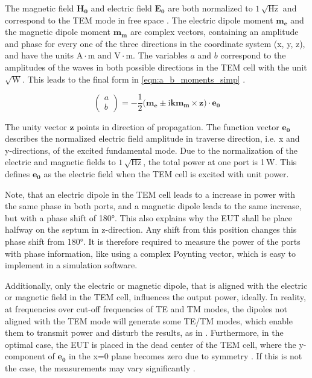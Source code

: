 The magnetic field $\mathbf{H_0}$ and electric field $\mathbf{E_0}$ are both normalized to $1\,\sqrt{\mathrm{Hz}}$ \cite{Kreindl_Bauernfeind_Weiss_Stockreiter_Kaltenbacher_2024} and correspond to the TEM mode in free space \cite{Sreenivasiah_Chang_Ma_1981}. The electric dipole moment $\mathbf{m_e}$ and the magnetic dipole moment $\mathbf{m_m}$ are complex vectors, containing an amplitude and phase for every one of the three directions in the coordinate system (x, y, z), and have the units $\mathrm{A\cdot m}$ and $\mathrm{V\cdot m}$. The variables $a$ and $b$ correspond to the amplitudes of the waves in both possible directions in the TEM cell with the unit $\sqrt{\mathrm{W}}$.
This leads to the final form in \autoref{eqn:a_b_moments_simp} \cite{Sreenivasiah_Chang_Ma_1981}.

\begin{equation}
    \begin{pmatrix}a \\b\end{pmatrix} =-\frac{1}{2}(\mathbf{m_e\pm \mathrm{i}k\mathbf{m_m}\times \mathbf{z})\cdot \mathbf{e_0}}
    \label{eqn:a_b_moments_simp}
\end{equation}

The unity vector $\mathbf{z}$ points in direction of propagation. The function vector $\mathbf{e_0}$ describes the normalized electric field amplitude in traverse direction, i.e. x and y-directions, of the excited fundamental mode. Due to the normalization of the electric and magnetic fields to $1\,\sqrt{\mathrm{Hz}}$, the total power at one port is 1\,W. This defines $\mathbf{e_0}$ as the electric field when the TEM cell is excited with unit power. 

Note, that an electric dipole in the TEM cell leads to a increase in power with the same phase in both ports, and a magnetic dipole leads to the same increase, but with a phase shift of 180°. This also explains why the EUT shall be place halfway on the septum in z-direction. Any shift from this position changes this phase shift from 180°. It is therefore required to measure the power of the ports with phase information, like using a complex Poynting vector, which is easy to implement in a simulation software. 

Additionally, only the electric or magnetic dipole, that is aligned with the electric or magnetic field in the TEM cell, influences the output power, ideally. In reality, at frequencies over cut-off frequencies of TE and TM modes, the dipoles not aligned with the TEM mode will generate some TE/TM modes, which enable them to transmit power and disturb the results, as in \cite{Kreindl_Bauernfeind_Weiss_Stockreiter_Yenumula_Narayanan_Kaltenbacher_2022}. Furthermore, in the optimal case, the EUT is placed in the dead center of the TEM cell, where the y-component of $\mathbf{e_0}$ in the x=0 plane becomes zero due to symmetry \cite{Sreenivasiah_Chang_Ma_1981}. If this is not the case, the measurements may vary significantly \cite{Kreindl_Bauernfeind_Weiss_Stockreiter_Yenumula_Narayanan_Kaltenbacher_2022}.


